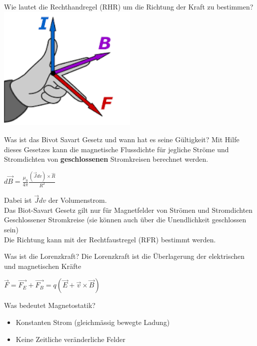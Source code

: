 \begin{karte}{Wie lautet die Rechthandregel (RHR) um die Richtung der Kraft zu bestimmen?}
	\center \includegraphics[width=0.5\textwidth]{pics/MS_RHR.png} %

\begin{karte}{Was ist das Bivot Savart Gesetz und wann hat es seine Gültigkeit?}
	Mit Hilfe dieses Gesetzes kann die magnetische Flussdichte für jegliche Ströme und Stromdichten von \textbf{geschlossenen} Stromkreisen berechnet werden.
	\begin{center}
		\begin{huge}
			$d \vec{B}=\frac{\mu_{0}}{4 \pi} \frac{(\vec{J} d v) \times \hat{R}}{R^{2}}$
		\end{huge}
	\end{center}
	Dabei ist $\vec{J} d v$ der Volumenstrom.\\[5pt]
	Das Biot-Savart Gesetz gilt nur für Magnetfelder von Strömen und Stromdichten Geschlossener Stromkreise (sie können auch über die Unendlichkeit geschlossen sein)\\[5pt]
	Die Richtung kann mit der Rechtfaustregel (RFR) bestimmt werden.
\end{karte}

\begin{karte}{Was ist die Lorenzkraft?}
	Die Lorenzkraft ist die Überlagerung der elektrischen und magnetischen Kräfte\\
	\begin{center}
		\begin{huge}
			$\vec{F}=\vec{F_{E}}+\vec{F_{B}}=q(\vec{E}+\vec{v} \times \vec{B})$
		\end{huge}
	\end{center}
\end{karte}

\begin{karte}{Was bedeutet Magnetostatik?}
	\begin{itemize}
		\item Konstanten Strom (gleichmässig bewegte Ladung)
		\item Keine Zeitliche veränderliche Felder
	\end{itemize}
\end{karte}


\end{karte}
